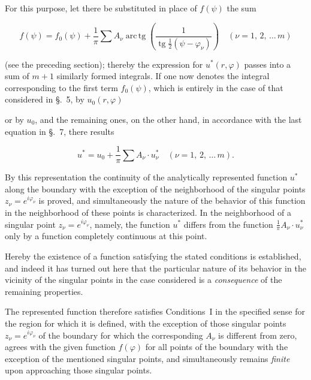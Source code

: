 \documentclass{article}
\begin{document}
For this purpose, let there be substituted in place of $f(\psi)$ the sum

\[

f(\psi) = f_0(\psi) + \frac{1}{\pi} \sum A_\nu \operatorname{arc\,tg}\left(\frac{1}{\operatorname{tg}\frac{1}{2}(\psi - \varphi_\nu)}\right) \quad (\nu = 1, \, 2, \, \dots \, m)

\]

(see the preceding section); thereby the expression for $u^*(r, \varphi)$ passes into a sum of $m + 1$ similarly formed integrals. If one now denotes the integral corresponding to the first term $f_0(\psi)$, which is entirely in the case of that considered in §.~5, by $u_0(r, \varphi)$




or by $u_0$, and the remaining ones, on the other hand, in accordance with the last equation in §.~7, there results

\[

u^* = u_0 + \frac{1}{\pi} \sum A_\nu \cdot u_\nu^* \quad (\nu = 1, \, 2, \, \dots \, m).

\]

By this representation the continuity of the analytically represented function $u^*$ along the boundary with the exception of the neighborhood of the singular points $z_\nu = e^{i\varphi_\nu}$ is proved, and simultaneously the nature of the behavior of this function in the neighborhood of these points is characterized. In the neighborhood of a singular point $z_\nu = e^{i\varphi_\nu}$, namely, the function $u^*$ differs from the function $\frac{1}{\pi} A_\nu \cdot u_\nu^*$ only by a function completely continuous at this point.



Hereby the existence of a function satisfying the stated conditions is established, and indeed it has turned out here that the particular nature of its behavior in the vicinity of the singular points in the case considered is a \emph{consequence} of the remaining properties.



The represented function therefore satisfies Conditions~I in the specified sense for the region for which it is defined, with the exception of those singular points $z_\nu = e^{i\varphi_\nu}$ of the boundary for which the corresponding $A_\nu$ is different from zero, agrees with the given function $f(\varphi)$ for all points of the boundary with the exception of the mentioned singular points, and simultaneously remains \emph{finite} upon approaching those singular points.
\end{document}

